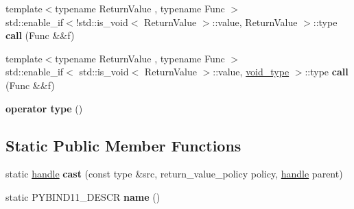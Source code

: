 \begin{DoxyCompactItemize}
\item 
{\footnotesize template$<$typename Return\+Value , typename Func $>$ }\\std\+::enable\+\_\+if$<$!std\+::is\+\_\+void$<$ Return\+Value $>$\+::value, Return\+Value $>$\+::type {\bfseries call} (Func \&\&f)\hypertarget{classtype__caster_3_01std_1_1tuple_3_01_tuple_8_8_8_01_4_01_4_aef2f5de8e745982780cae0fe0204f9bf}{}\label{classtype__caster_3_01std_1_1tuple_3_01_tuple_8_8_8_01_4_01_4_aef2f5de8e745982780cae0fe0204f9bf}

\item 
{\footnotesize template$<$typename Return\+Value , typename Func $>$ }\\std\+::enable\+\_\+if$<$ std\+::is\+\_\+void$<$ Return\+Value $>$\+::value, \hyperlink{structvoid__type}{void\+\_\+type} $>$\+::type {\bfseries call} (Func \&\&f)\hypertarget{classtype__caster_3_01std_1_1tuple_3_01_tuple_8_8_8_01_4_01_4_a655be8a55c8d48182be7292b64b120d7}{}\label{classtype__caster_3_01std_1_1tuple_3_01_tuple_8_8_8_01_4_01_4_a655be8a55c8d48182be7292b64b120d7}

\item 
{\bfseries operator type} ()\hypertarget{classtype__caster_3_01std_1_1tuple_3_01_tuple_8_8_8_01_4_01_4_a277a58298edd7cee21b81b164eef2d57}{}\label{classtype__caster_3_01std_1_1tuple_3_01_tuple_8_8_8_01_4_01_4_a277a58298edd7cee21b81b164eef2d57}

\end{DoxyCompactItemize}
\subsection*{Static Public Member Functions}
\begin{DoxyCompactItemize}
\item 
static \hyperlink{classhandle}{handle} {\bfseries cast} (const type \&src, return\+\_\+value\+\_\+policy policy, \hyperlink{classhandle}{handle} parent)\hypertarget{classtype__caster_3_01std_1_1tuple_3_01_tuple_8_8_8_01_4_01_4_a09f5264f29c7755dab2b2d3a9a1ffcca}{}\label{classtype__caster_3_01std_1_1tuple_3_01_tuple_8_8_8_01_4_01_4_a09f5264f29c7755dab2b2d3a9a1ffcca}

\item 
static P\+Y\+B\+I\+N\+D11\+\_\+\+D\+E\+S\+CR {\bfseries name} ()\hypertarget{classtype__caster_3_01std_1_1tuple_3_01_tuple_8_8_8_01_4_01_4_a56710e4b4f97ad44021fd753367c9d29}{}\label{classtype__caster_3_01std_1_1tuple_3_01_tuple_8_8_8_01_4_01_4_a56710e4b4f97ad44021fd753367c9d29}

\end{DoxyCompactItemize}
